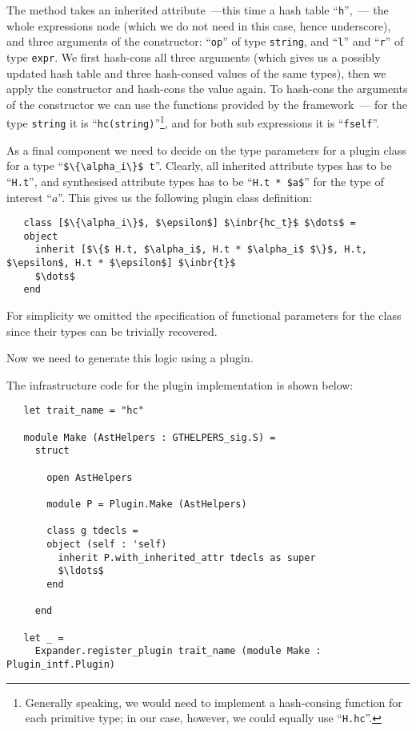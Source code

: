 The method takes an inherited attribute~---this time a hash table ``\lstinline{h}'',~--- the whole expressions node (which we do not
need in this case, hence underscore), and three arguments of the constructor: ``\lstinline{op}'' of type \lstinline{string}, and
``\lstinline{l}'' and ``\lstinline{r}'' of type \lstinline{expr}. We first hash-cons all three arguments (which gives us a possibly updated
hash table and three hash-consed values of the same types), then we apply the constructor and hash-cons the value again. To hash-cons
the arguments of the constructor we can use the functions provided by the framework~--- for the type \lstinline{string} it is
``\lstinline{hc(string)}''\footnote{Generally speaking, we would need to implement a hash-consing function for each primitive type; in
  our case, however, we could equally use ``\lstinline{H.hc}''.}, and for both sub expressions it is ``\lstinline{fself}''.

As a final component we need to decide on the type parameters for a plugin class for a type ``\lstinline|$\{\alpha_i\}$ t|''. Clearly,
all inherited attribute types has to be ``\lstinline{H.t}'', and synthesised attribute types has to be ``\lstinline{H.t * $a$}'' for the
type of interest ``$a$''. This gives us the following plugin class definition:

\begin{lstlisting}
   class [$\{\alpha_i\}$, $\epsilon$] $\inbr{hc_t}$ $\dots$ =
   object
     inherit [$\{$ H.t, $\alpha_i$, H.t * $\alpha_i$ $\}$, H.t, $\epsilon$, H.t * $\epsilon$] $\inbr{t}$
     $\dots$
   end
\end{lstlisting}

For simplicity we omitted the specification of functional parameters for the class since their types can be trivially
recovered.

Now we need to generate this logic using a plugin.

The infrastructure code for the plugin implementation is shown below:

\begin{lstlisting}
   let trait_name = "hc"
  
   module Make (AstHelpers : GTHELPERS_sig.S) =
     struct
     
       open AstHelpers

       module P = Plugin.Make (AstHelpers)

       class g tdecls =
       object (self : 'self)
         inherit P.with_inherited_attr tdecls as super
         $\ldots$
       end

     end

   let _ =
     Expander.register_plugin trait_name (module Make : Plugin_intf.Plugin)
\end{lstlisting}

